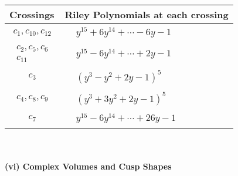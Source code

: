 \documentclass[1p]{elsarticle_modified}
\theoremstyle{definition}
\begin{document}
\begin{tabular}{m{50pt}|m{274pt}}
Crossings & \hspace{64pt}Riley Polynomials at each crossing \\
\hline $$\begin{aligned}c_{1},c_{10},c_{12}\end{aligned}$$&$\begin{aligned}
&y^{15}+6 y^{14}+\cdots-6 y-1
\end{aligned}$\\
\hline $$\begin{aligned}c_{2},c_{5},c_{6}\\c_{11}\end{aligned}$$&$\begin{aligned}
&y^{15}-6 y^{14}+\cdots+2 y-1
\end{aligned}$\\
\hline $$\begin{aligned}c_{3}\end{aligned}$$&$\begin{aligned}
&(y^3- y^2+2 y-1)^5
\end{aligned}$\\
\hline $$\begin{aligned}c_{4},c_{8},c_{9}\end{aligned}$$&$\begin{aligned}
&(y^3+3 y^2+2 y-1)^5
\end{aligned}$\\
\hline $$\begin{aligned}c_{7}\end{aligned}$$&$\begin{aligned}
&y^{15}-6 y^{14}+\cdots+26 y-1
\end{aligned}$\\
\hline
\end{tabular}\\~\\
\newpage\flushleft \textbf{(vi) Complex Volumes and Cusp Shapes}
\end{document}
